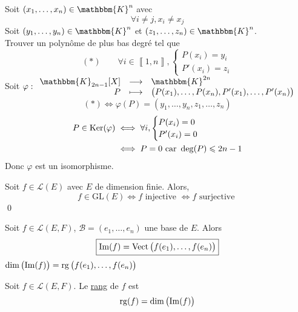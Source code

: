 \begin{exo}
	Soit $(x_1, \ldots, x_n) \in \mathbbm{K}^n$ avec \[
		\forall i \neq j, x_i \neq x_j
	\] Soit $(y_1, \ldots, y_n) \in \mathbbm{K}^n$ et $(z_1, \ldots, z_n) \in \mathbbm{K}^n$.\\
	Trouver un polynôme de plus bas degré tel que \[
		(*) \qquad \forall i \in \left\llbracket 1,n \right\rrbracket, \begin{cases}
			P(x_i) = y_i\\
			P'(x_i) = z_i
		\end{cases}
	\]
	Soit $\varphi : \begin{array}{rcl}
		\mathbbm{K}_{2n-1}[X] &\longrightarrow& \mathbbm{K}^{2n} \\
		P &\longmapsto& \big(P(x_1), \ldots, P(x_n), P'(x_1), \ldots, P'(x_n)\big) 
	\end{array}$ \[
		(*) \iff \varphi(P) = (y_1, \ldots, y_n, z_1, \ldots, z_n)
	\] 
	\begin{align*}
		P \in \operatorname{Ker}(\varphi) &\iff \forall i, \begin{cases}
			P(x_i) = 0\\
			P'(x_i) = 0
		\end{cases}\\
		&\iff P = 0 \text{ car } \deg(P) \leqslant 2n-1
	\end{align*}
	Donc $\varphi$ est un isomorphisme.
\end{exo}

\begin{crlr}
	Soit $f \in \mathcal{L}(E)$ avec $E$ de dimension finie. Alors, \[
		f \in \mathrm{GL}(E) \iff f \text{ injective } \iff f \text{ surjective }
	\]\qed
\end{crlr}

\begin{rmk}
	Soit $f \in \mathcal{L}(E,F)$, $\mathcal{B} = (e_1, \ldots, e_n)$ une base de $E$. Alors \[
		\boxed{\mathrm{Im}(f) = \operatorname{Vect}\big(f(e_1), \ldots, f(e_n)\big)}
	\]
	$\dim\big(\mathrm{Im}(f)\big) = \operatorname{rg}\big(f(e_1), \ldots, f(e_n)\big)$
\end{rmk}

\begin{defn}
	Soit $f \in \mathcal{L}(E,F)$. Le \underline{rang} de $f$ est \[
		\operatorname{rg}(f) = \dim\big(\mathrm{Im}(f)\big)
	\]
\end{defn}

